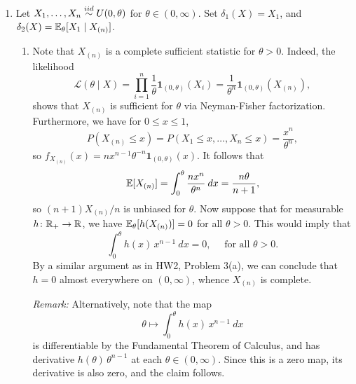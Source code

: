 \documentclass[11pt]{article}
\begin{document}
\begin{enumerate}
        \item Let $X_1, \dots, X_n \overset{iid}{\sim} U(0, \theta)$ for $\theta \in (0, \infty)$.
        Set $\delta_1(X) = X_1$, and $\delta_2(X) = \mathbb{E}_\theta[X_1\mid X_{(n)}]$.
        \begin{enumerate}
            \item Note that $X_{(n)}$ is a complete sufficient statistic for
            $\theta > 0$.
            Indeed, the likelihood \[
                \mathcal{L}(\theta\mid X)
                    = \prod_{i = 1}^n \frac{1}{\theta} \bm{1}_{(0, \theta)}(X_i)
                    = \frac{1}{\theta^n} \bm{1}_{(0, \theta)}(X_{(n)}),
            \] shows that $X_{(n)}$ is sufficient for $\theta$ via
            Neyman-Fisher factorization.
            Furthermore, we have for $0 \leq x \leq 1$, \[
                P(X_{(n)} \leq x)
                    = P(X_1 \leq x, \dots, X_n \leq x)
                    = \frac{x^n}{\theta^n},
            \] so $f_{X_{(n)}}(x) = nx^{n - 1} \theta^{-n} \bm{1}_{(0, \theta)}(x)$.
            It follows that \[
                \mathbb{E}[X_{(n)}]
                    = \int_0^\theta \frac{nx^n}{\theta^n}\:dx = \frac{n\theta}{n + 1},
            \] so $(n + 1) X_{(n)} / n$ is unbiased for $\theta$.
            Now suppose that for measurable $h\colon \mathbb{R}_+ \to \mathbb{R}$, we have
            $\mathbb{E}_\theta[h(X_{(n)})] = 0$ for all $\theta > 0$.
            This would imply that \[
                \int_0^\theta h(x)\, x^{n - 1} \:dx = 0, \quad \text{ for all }
                \theta > 0.
            \] By a similar argument as in HW2, Problem 3(a), we can conclude
            that $h = 0$ almost everywhere on $(0, \infty)$, whence $X_{(n)}$
            is complete.


            \emph{Remark:} Alternatively, note that the map \[
                \theta \mapsto \int_0^\theta h(x)\, x^{n - 1} \:dx
            \] is differentiable by the Fundamental Theorem of Calculus, and
            has derivative $h(\theta)\,\theta^{n - 1}$ at each $\theta \in (0,
            \infty)$.
            Since this is a zero map, its derivative is also zero, and the
            claim follows. \\


\end{enumerate}
\end{enumerate}
\end{document}
